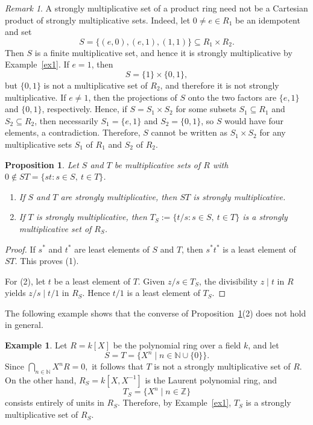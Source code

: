 \documentclass[11pt]{amsart}
\newtheorem{proposition}[theorem]{Proposition}
\theoremstyle{definition}
\newtheorem{example}[theorem]{Example}
\theoremstyle{remark}
\newtheorem{remark}[theorem]{Remark}
\begin{document}
\begin{remark}
A strongly multiplicative set of a product ring need not be a Cartesian product of strongly multiplicative sets. Indeed, let $0\neq e\in R_1$ be an idempotent and set
\[
S=\{(e,0),(e,1),(1,1)\}\subseteq R_1\times R_2.
\]
Then $S$ is a finite multiplicative set, and hence it is strongly multiplicative by Example~\ref{ex1}. If $e=1$, then
\[
S=\{1\}\times \{0,1\},
\]
but $\{0,1\}$ is not a multiplicative set of $R_2$, and therefore it is not strongly multiplicative. If $e\neq 1$, then the projections of $S$ onto the two factors are $\{e,1\}$ and $\{0,1\}$, respectively. Hence, if $S=S_1\times S_2$ for some subsets $S_1\subseteq R_1$ and $S_2\subseteq R_2$, then necessarily $S_1=\{e,1\}$ and $S_2=\{0,1\}$, so $S$ would have four elements, a contradiction. Therefore, $S$ cannot be written as $S_1\times S_2$ for any multiplicative sets $S_1$ of $R_1$ and $S_2$ of $R_2$.
\end{remark}

\begin{proposition}\label{prop:locperm}
Let $S$ and $T$ be multiplicative sets of $R$ with $0 \notin ST=\{st : s \in S,\ t \in T\}$.
\begin{enumerate}
\item If $S$ and $T$ are strongly multiplicative, then $ST$ is strongly multiplicative.
\item If $T$ is strongly multiplicative, then $T_S:=\{t/s : s \in S,\ t \in T\}$ is a strongly multiplicative set of $R_S$.
\end{enumerate}
\end{proposition}

\begin{proof}
If $s^\ast$ and $t^\ast$ are least elements of $S$ and $T$, then $s^\ast t^\ast$ is a least element of $ST$.
This proves (1).

For (2), let $t$ be a least element of $T$.
Given $z/s \in T_S$, the divisibility $z \mid t$ in $R$ yields $z/s \mid t/1$ in $R_S$.
Hence $t/1$ is a least element of $T_S$.
\end{proof}

The following example shows that the converse of Proposition~\ref{prop:locperm}(2) does not hold in general.

\begin{example}
Let $R=k[X]$ be the polynomial ring over a field $k$, and let
\[
S=T=\{X^n \mid n\in \mathbb{N}\cup\{0\}\}.
\]
Since $\bigcap_{n\in\mathbb{N}} X^nR=0,$ it follows that $T$ is not a strongly multiplicative set of $R$. On the other hand, $R_S=k[X,X^{-1}]$ is the Laurent polynomial ring, and
\[
T_S=\{X^n \mid n\in\mathbb{Z}\}
\]
consists entirely of units in $R_S$. Therefore, by Example~\ref{ex1}, $T_S$ is a strongly multiplicative set of $R_S$.
\end{example}
\end{document}
